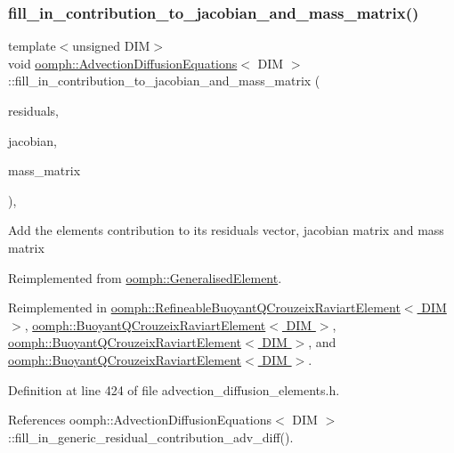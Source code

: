 \subsubsection{\texorpdfstring{fill\+\_\+in\+\_\+contribution\+\_\+to\+\_\+jacobian\+\_\+and\+\_\+mass\+\_\+matrix()}{fill\_in\_contribution\_to\_jacobian\_and\_mass\_matrix()}}
{\footnotesize\ttfamily template$<$unsigned D\+IM$>$ \\
void \hyperlink{classoomph_1_1AdvectionDiffusionEquations}{oomph\+::\+Advection\+Diffusion\+Equations}$<$ D\+IM $>$\+::fill\+\_\+in\+\_\+contribution\+\_\+to\+\_\+jacobian\+\_\+and\+\_\+mass\+\_\+matrix (\begin{DoxyParamCaption}\item[{\hyperlink{classoomph_1_1Vector}{Vector}$<$ double $>$ \&}]{residuals,  }\item[{\hyperlink{classoomph_1_1DenseMatrix}{Dense\+Matrix}$<$ double $>$ \&}]{jacobian,  }\item[{\hyperlink{classoomph_1_1DenseMatrix}{Dense\+Matrix}$<$ double $>$ \&}]{mass\+\_\+matrix }\end{DoxyParamCaption})\hspace{0.3cm}{\ttfamily [inline]}, {\ttfamily [virtual]}}

Add the element\textquotesingle{}s contribution to its residuals vector, jacobian matrix and mass matrix 

Reimplemented from \hyperlink{classoomph_1_1GeneralisedElement_a2b6294a730647cf865da94f2531466f8}{oomph\+::\+Generalised\+Element}.



Reimplemented in \hyperlink{classoomph_1_1RefineableBuoyantQCrouzeixRaviartElement_a06f1e2dbdf7a8ebaa964d421aee453ee}{oomph\+::\+Refineable\+Buoyant\+Q\+Crouzeix\+Raviart\+Element$<$ D\+I\+M $>$}, \hyperlink{classoomph_1_1BuoyantQCrouzeixRaviartElement_a7d22156d87949e4c64d597d60fe00225}{oomph\+::\+Buoyant\+Q\+Crouzeix\+Raviart\+Element$<$ D\+I\+M $>$}, \hyperlink{classoomph_1_1BuoyantQCrouzeixRaviartElement_a7d22156d87949e4c64d597d60fe00225}{oomph\+::\+Buoyant\+Q\+Crouzeix\+Raviart\+Element$<$ D\+I\+M $>$}, and \hyperlink{classoomph_1_1BuoyantQCrouzeixRaviartElement_a7d22156d87949e4c64d597d60fe00225}{oomph\+::\+Buoyant\+Q\+Crouzeix\+Raviart\+Element$<$ D\+I\+M $>$}.



Definition at line 424 of file advection\+\_\+diffusion\+\_\+elements.\+h.



References oomph\+::\+Advection\+Diffusion\+Equations$<$ D\+I\+M $>$\+::fill\+\_\+in\+\_\+generic\+\_\+residual\+\_\+contribution\+\_\+adv\+\_\+diff().



